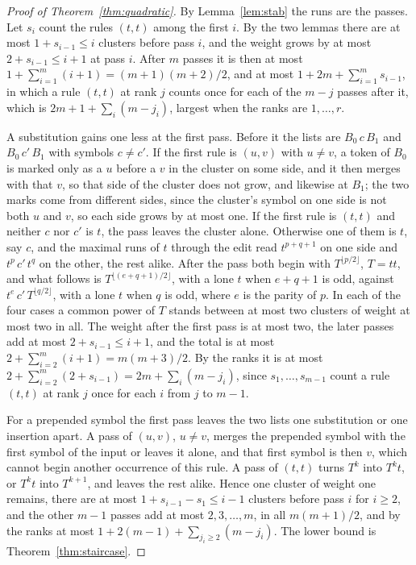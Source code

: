 \documentclass[11pt,a4paper]{article}
\theoremstyle{definition}
\theoremstyle{plain}
\begin{document}
\begin{proof}[Proof of Theorem~\ref{thm:quadratic}]
By Lemma~\ref{lem:stab} the runs are the passes. Let \(s_i\) count the rules \((t, t)\) among the first \(i\). By the
two lemmas there are at most \(1 + s_{i-1} \le i\) clusters before pass \(i\), and the weight grows by at most
\(2 + s_{i-1} \le i + 1\) at pass \(i\). After \(m\) passes it is then at most
\(1 + \sum_{i=1}^{m}(i + 1) = (m + 1)(m + 2)/2\), and at most \(1 + 2m + \sum_{i=1}^{m} s_{i-1}\), in which a rule
\((t, t)\) at rank \(j\) counts once for each of the \(m - j\) passes after it, which is \(2m + 1 + \sum_i (m - j_i)\),
largest when the ranks are \(1, \dots, r\).

A substitution gains one less at the first pass. Before it the lists are \(B_0\,c\,B_1\) and \(B_0\,c'\,B_1\) with
symbols \(c \ne c'\). If the first rule is \((u, v)\) with \(u \ne v\), a token of \(B_0\) is marked only as a \(u\)
before a \(v\) in the cluster on some side, and it then merges with that \(v\), so that side of the cluster does not
grow, and likewise at \(B_1\); the two marks come from different sides, since the cluster's symbol on one side is not
both \(u\) and \(v\), so each side grows by at most one. If the first rule is \((t, t)\) and neither \(c\) nor \(c'\) is
\(t\), the pass leaves the cluster alone. Otherwise one of them is \(t\), say \(c\), and the maximal runs of \(t\)
through the edit read \(t^{p + q + 1}\) on one side and \(t^p\,c'\,t^q\) on the other, the rest alike. After the pass
both begin with \(T^{\lfloor p/2 \rfloor}\), \(T = tt\), and what follows is \(T^{\lfloor (e + q + 1)/2 \rfloor}\), with
a lone \(t\) when \(e + q + 1\) is odd, against \(t^e\,c'\,T^{\lfloor q/2 \rfloor}\), with a lone \(t\) when \(q\) is
odd, where \(e\) is the parity of \(p\). In each of the four cases a common power of \(T\) stands between at most two
clusters of weight at most two in all. The weight after the first pass is at most two, the later passes add at most
\(2 + s_{i - 1} \le i + 1\), and the total is at most \(2 + \sum_{i=2}^{m}(i + 1) = m(m + 3)/2\). By the ranks it is at
most \(2 + \sum_{i=2}^{m} (2 + s_{i-1}) = 2m + \sum_i (m - j_i)\), since \(s_1, \dots, s_{m-1}\) count a rule \((t, t)\)
at rank \(j\) once for each \(i\) from \(j\) to \(m - 1\).

For a prepended symbol the first pass leaves the two lists one substitution or one insertion apart. A pass of
\((u, v)\), \(u \ne v\), merges the prepended symbol with the first symbol of the input or leaves it alone, and that
first symbol is then \(v\), which cannot begin another occurrence of this rule. A pass of \((t, t)\) turns \(T^k\) into
\(T^k t\), or \(T^k t\) into \(T^{k+1}\), and leaves the rest alike. Hence one cluster of weight one remains, there are
at most \(1 + s_{i-1} - s_1 \le i - 1\) clusters before pass \(i\) for \(i \ge 2\), and the other \(m - 1\) passes add
at most \(2, 3, \dots, m\), in all \(m(m + 1)/2\), and by the ranks at most
\(1 + 2(m - 1) + \sum_{j_i \ge 2} (m - j_i)\). The lower bound is Theorem~\ref{thm:staircase}.
\end{proof}
\end{document}
